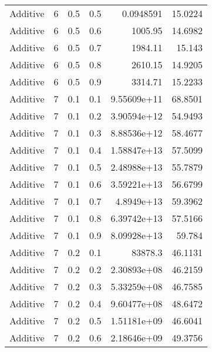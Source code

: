 \documentclass{article}
\begin{document}
\begin{longtable}[H]{lrrrrr}
 Additive       &       6 &   0.5 &            0.5 &      0.0948591   &         15.0224 \\
 Additive       &       6 &   0.5 &            0.6 &   1005.95        &         14.6982 \\
 Additive       &       6 &   0.5 &            0.7 &   1984.11        &         15.143  \\
 Additive       &       6 &   0.5 &            0.8 &   2610.15        &         14.9205 \\
 Additive       &       6 &   0.5 &            0.9 &   3314.71        &         15.2233 \\
 Additive       &       7 &   0.1 &            0.1 &      9.55609e+11 &         68.8501 \\
 Additive       &       7 &   0.1 &            0.2 &      3.90594e+12 &         54.9493 \\
 Additive       &       7 &   0.1 &            0.3 &      8.88536e+12 &         58.4677 \\
 Additive       &       7 &   0.1 &            0.4 &      1.58847e+13 &         57.5099 \\
 Additive       &       7 &   0.1 &            0.5 &      2.48988e+13 &         55.7879 \\
 Additive       &       7 &   0.1 &            0.6 &      3.59221e+13 &         56.6799 \\
 Additive       &       7 &   0.1 &            0.7 &      4.8949e+13  &         59.3962 \\
 Additive       &       7 &   0.1 &            0.8 &      6.39742e+13 &         57.5166 \\
 Additive       &       7 &   0.1 &            0.9 &      8.09928e+13 &         59.784  \\
 Additive       &       7 &   0.2 &            0.1 &  83878.3         &         46.1131 \\
 Additive       &       7 &   0.2 &            0.2 &      2.30893e+08 &         46.2159 \\
 Additive       &       7 &   0.2 &            0.3 &      5.33259e+08 &         46.7585 \\
 Additive       &       7 &   0.2 &            0.4 &      9.60477e+08 &         48.6472 \\
 Additive       &       7 &   0.2 &            0.5 &      1.51181e+09 &         46.6041 \\
 Additive       &       7 &   0.2 &            0.6 &      2.18646e+09 &         49.3756 \\

\end{longtable}
\end{document}
